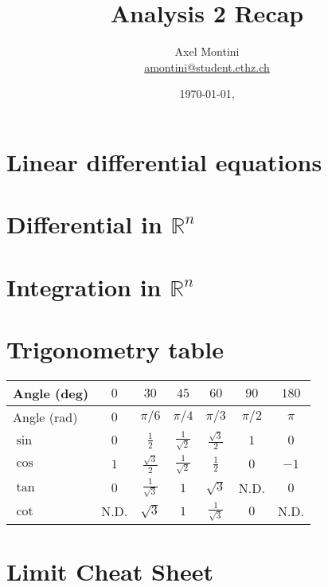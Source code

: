 \documentclass[8pt,a4paper,twocolumn,table]{extarticle}
\title{Analysis 2 Recap}
\author{Axel Montini \\ \href{mailto:amontini@student.ethz.ch}{amontini@student.ethz.ch}}
\date{\today \hfill \texttt{\branch}, \texttt{\commit}}
\newcommand{\R}{\mathbb{R}}
\begin{document}
\abovedisplayskip=0pt
\abovedisplayshortskip=0pt
\belowdisplayskip=0pt
\belowdisplayshortskip=0pt
\maketitle

\section{Linear differential equations}


\section{Differential in $\R^n$}


\section[Integration in multiple dimensions]{Integration in $\R^n$}


\section{Trigonometry table}
 {\renewcommand{\arraystretch}{1.4}
  \begin{tabular}{| l || c | c | c | c | c | c |}
      \hline
      Angle (deg) & $0$  & $30$                 & $45$                 & $60$                 & $90$      & $180$ \\
      \hline
      Angle (rad) & $0$  & $\pi / 6$            & $\pi / 4$            & $\pi / 3$            & $\pi / 2$ & $\pi$ \\
      \hline
      \hline
      $\sin$      & $0$  & $\frac{1}{2}$        & $\frac{1}{\sqrt{2}}$ & $\frac{\sqrt{3}}{2}$ & $1$       & $0$   \\
      \hline
      $\cos$      & $1$  & $\frac{\sqrt{3}}{2}$ & $\frac{1}{\sqrt{2}}$ & $\frac{1}{2}$        & $0$       & $-1$  \\
      \hline
      $\tan$      & $0$  & $\frac{1}{\sqrt{3}}$ & $1$                  & $\sqrt{3}$           & N.D.      & $0$   \\
      \hline
      $\cot$      & N.D. & $\sqrt{3}$           & $1$                  & $\frac{1}{\sqrt{3}}$ & $0$       & N.D.  \\
      \hline
  \end{tabular}}

\section{Limit Cheat Sheet}
\end{document}
